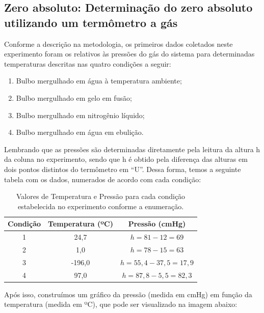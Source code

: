 \subsection{Zero absoluto: Determinação do zero absoluto utilizando um termômetro a
gás}

Conforme a descrição na metodologia, os primeiros dados coletados neste experimento foram os relativos às pressões do gás do sistema para determinadas temperaturas descritas nas quatro condições a seguir:

\begin{enumerate}
    \item Bulbo mergulhado em água à temperatura ambiente;
    \item Bulbo mergulhado em gelo em fusão;
    \item Bulbo mergulhado em nitrogênio líquido;
    \item Bulbo mergulhado em água em ebulição.
\end{enumerate}

Lembrando que as pressões são determinadas diretamente pela leitura da altura h da coluna no experimento, sendo que h é obtido pela diferença das alturas em dois pontos distintos do termômetro em “U”. Dessa forma, temos a seguinte tabela com os dados, numerados de acordo com cada condição:

\begin{table}[H]
    \centering
    \begin{tabular}{ |c||c||c| }
        \hline
        \textbf{Condição} & \textbf{Temperatura (ºC)} & \textbf{Pressão (cmHg)}\\
        \hline 
        1       & 24,7     & $h = 81 - 12 = 69$  \\
        2       & 1,0      & $h = 78 - 15 = 63$  \\
        3       & -196,0   & $h = 55,4 - 37,5 = 17,9$ \\
        4       & 97,0     & $h = 87,8 - 5,5 = 82,3$ \\
        \hline
        \end{tabular}
    \caption{Valores de Temperatura e Pressão para cada condição estabelecida no experimento conforme a enumeração.} 
\end{table}

Após isso, construímos um gráfico da pressão (medida em cmHg) em função da temperatura (medida em ºC), que pode ser visualizado na imagem abaixo:

